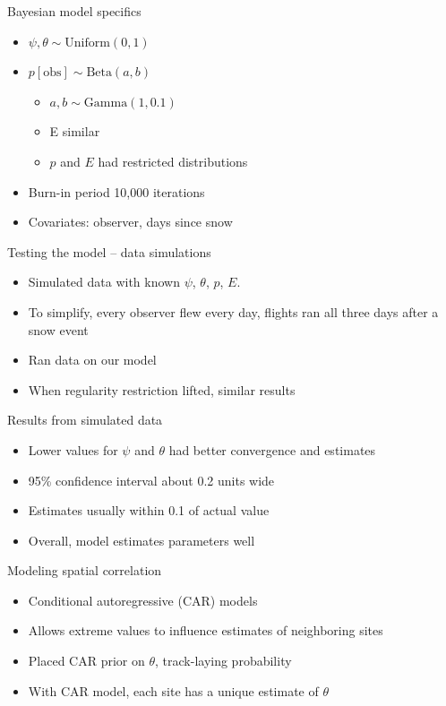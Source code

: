\documentclass{beamer}
\begin{document}
\begin{frame}{Bayesian model specifics}
	\begin{itemize}
		\item $\psi,\theta \sim \text{Uniform}(0,1)$
		\item $p[\text{obs}] \sim \text{Beta}(a,b)$
		\begin{itemize}
			\item $a, b \sim \text{Gamma}(1,0.1)$
			\item E similar
			\item $p$ and $E$ had restricted distributions
		\end{itemize}
		\item Burn-in period 10,000 iterations
		\item Covariates: observer, days since snow
	\end{itemize}
\end{frame}

\begin{frame}{Testing the model -- data simulations}
	\begin{itemize}
		\item Simulated data with known $\psi$, $\theta$, $p$, $E$.
		\item To simplify, every observer flew every day, flights ran all
		three days after a snow event
		\item Ran data on our model
		\item When regularity restriction lifted, similar results
	\end{itemize}
\end{frame}

\begin{frame}{Results from simulated data}
	\begin{itemize}
		\item Lower values for $\psi$ and $\theta$ had better convergence and
		estimates
		\item 95\% confidence interval about 0.2 units wide
		\item Estimates usually within 0.1 of actual value
		\item Overall, model estimates parameters well
	\end{itemize}
\end{frame}

\begin{frame}{Modeling spatial correlation}
	\begin{itemize}
		\item Conditional autoregressive (CAR) models
		\item Allows extreme values to influence estimates of neighboring sites
		\item Placed CAR prior on $\theta$, track-laying probability
		\item With CAR model, each site has a unique estimate of $\theta$
	\end{itemize}
\end{frame}
\end{document}
